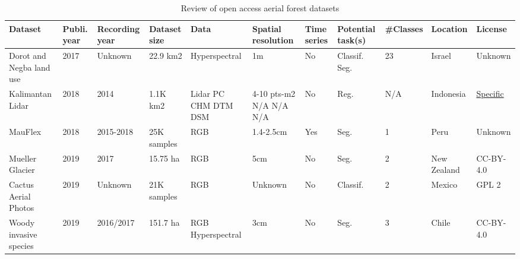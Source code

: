 \documentclass{CUP-JNL-DTM}%
\theoremstyle{definition}
\numberwithin{equation}{section}
\begin{document}
\begin{table*}[ht]
\fontsize{6.5pt}{7.5pt}\selectfont %
\renewcommand{\arraystretch}{1.5} %
\setlength\tabcolsep{5pt} %
\caption{Review of open access aerial forest datasets}
{\begin{fntable}
\centering
\begin{tabular}{p{1.5cm} | p{0.4cm} | p{1cm} | p{1.3cm} | p{1.2cm} : p{1.1cm} | p{0.4cm} | p{0.7cm} | p{0.8cm} | p{1cm} | p{1.1cm}}
\toprule
Dataset  & Publi. year & Recording year & Dataset size & Data  & Spatial resolution & Time series & Potential task(s) & \#Classes & Location  & License  \\
\midrule

Dorot and Negba land use \cite{paz-kagan_multiscale_2017} & 2017 & Unknown & 22.9 km2 & Hyperspectral & 1m & No & Classif. \newline Seg. & 23 & Israel & Unknown \\

Kalimantan Lidar \cite{ferraz_carbon_2018} & 2018 & 2014 & 1.1K km2 & Lidar PC \newline CHM \newline DTM \newline DSM & 4-10 pts-m2 \newline N/A \newline N/A \newline N/A & No & Reg. & N/A & Indonesia & \href{https://www.earthdata.nasa.gov/learn/use-data/data-use-policy?}{Specific} \\

MauFlex	\cite{morales_automatic_2018} & 2018 & 2015-2018 & 25K samples & RGB & 1.4-2.5cm & Yes & Seg. & 1 & Peru & Unknown \\

Mueller Glacier	\cite{kattenborn_convolutional_2019}  & 2019 & 2017 & 15.75 ha & RGB & 5cm & No & Seg. & 2 & New Zealand & CC-BY-4.0 \\

Cactus Aerial Photos \cite{lopez-jimenez_columnar_2019}	 & 2019 & Unknown & 21K samples & RGB & Unknown & No & Classif. & 2 & Mexico & GPL 2 \\

Woody invasive species \cite{kattenborn_uav_2019} & 2019 & 2016/2017 & 151.7 ha & RGB \newline Hyperspectral & 3cm \newline 10cm & No & Seg. & 3 & Chile & CC-BY-4.0 \\


\end{tabular}
\end{fntable}}
\end{table*}
\end{document}

